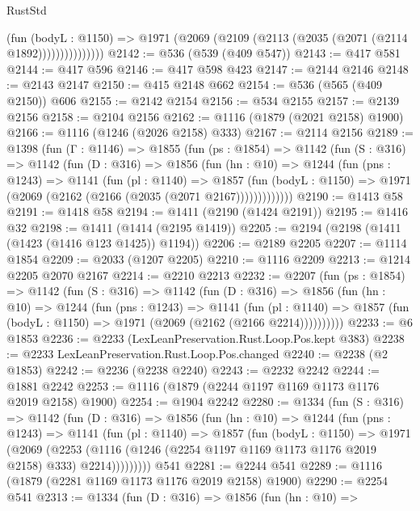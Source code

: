 \begin{lexlean}{RustStd}
\begin{coremodule}
{\begin{coremodule}
{{{{{{{{{{{                    (fun (bodyL : @1150) =>
                    @1971 (@2069 (@2109 (@2113 (@2035 (@2071 (@2114 @1892)))))))))))))))
@2142 := @536 (@539 (@409 @547))
@2143 := @417 @581
@2144 := @417 @596
@2146 := @417 @598 @423
@2147 := @2144 @2146
@2148 := @2143 @2147
@2150 := @415 @2148 @662
@2154 := @536 (@565 (@409 @2150)) @606
@2155 := @2142 @2154
@2156 := @534 @2155
@2157 := @2139 @2156
@2158 := @2104 @2156
@2162 := @1116 (@1879 (@2021 @2158) @1900)
@2166 := @1116 (@1246 (@2026 @2158) @333)
@2167 := @2114 @2156
@2189 := @1398
    (fun (Γ : @1146) =>
    @1855
      (fun (ps : @1854) =>
      @1142
        (fun (S : @316) =>
        @1142
          (fun (D : @316) =>
          @1856
            (fun (hn : @10) =>
            @1244
              (fun (pns : @1243) =>
              @1141
                (fun (pl : @1140) =>
                @1857
                  (fun (bodyL : @1150) =>
                  @1971 (@2069 (@2162 (@2166 (@2035 (@2071 @2167)))))))))))))
@2190 := @1413 @58
@2191 := @1418 @58
@2194 := @1411 (@2190 (@1424 @2191))
@2195 := @1416 @32
@2198 := @1411 (@1414 (@2195 @1419))
@2205 := @2194 (@2198 (@1411 (@1423 (@1416 @123 @1425)) @1194))
@2206 := @2189 @2205
@2207 := @1114 @1854
@2209 := @2033 (@1207 @2205)
@2210 := @1116 @2209
@2213 := @1214 @2205 @2070 @2167
@2214 := @2210 @2213
@2232 := @2207
    (fun (ps : @1854) =>
    @1142
      (fun (S : @316) =>
      @1142
        (fun (D : @316) =>
        @1856
          (fun (hn : @10) =>
          @1244
            (fun (pns : @1243) =>
            @1141
              (fun (pl : @1140) =>
              @1857 (fun (bodyL : @1150) => @1971 (@2069 (@2162 (@2166 @2214))))))))))
@2233 := @6 @1853
@2236 := @2233 (LexLeanPreservation.Rust.Loop.Pos.kept @383)
@2238 := @2233 LexLeanPreservation.Rust.Loop.Pos.changed
@2240 := @2238 (@2 @1853)
@2242 := @2236 (@2238 @2240)
@2243 := @2232 @2242
@2244 := @1881 @2242
@2253 := @1116 (@1879 (@2244 @1197 @1169 @1173 @1176 @2019 @2158) @1900)
@2254 := @1904 @2242
@2280 := @1334
    (fun (S : @316) =>
    @1142
      (fun (D : @316) =>
      @1856
        (fun (hn : @10) =>
        @1244
          (fun (pns : @1243) =>
          @1141
            (fun (pl : @1140) =>
            @1857
              (fun (bodyL : @1150) =>
              @1971
                (@2069
                  (@2253
                    (@1116 (@1246 (@2254 @1197 @1169 @1173 @1176 @2019 @2158) @333) @2214)))))))))
    @541
@2281 := @2244 @541
@2289 := @1116 (@1879 (@2281 @1169 @1173 @1176 @2019 @2158) @1900)
@2290 := @2254 @541
@2313 := @1334
    (fun (D : @316) =>
    @1856
      (fun (hn : @10) =>
}}}}}}}}}}}
\end{coremodule}}
\end{coremodule}
\end{lexlean}
